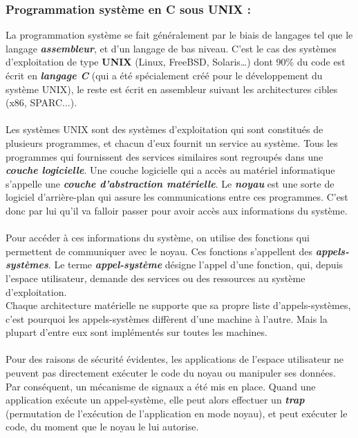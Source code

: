 		\subsubsection*{Programmation système en C sous UNIX :} 
			La programmation système se fait généralement par le biais de langages tel que le langage \textit{\textbf{assembleur}}, et d’un langage de bas niveau. C’est le cas des systèmes d’exploitation de type \textbf{UNIX} (Linux, FreeBSD, Solaris…) dont 90\% du code est écrit en \textit{\textbf{langage C}} (qui a été spécialement créé pour le développement du système UNIX), le reste est écrit en assembleur suivant les architectures cibles (x86, SPARC...).
			
			\paragraph{} Les systèmes UNIX sont des systèmes d'exploitation qui sont constitués de plusieurs programmes, et chacun d'eux fournit un service au système. Tous les programmes qui fournissent des services similaires sont regroupés dans une \textit{\textbf{couche logicielle}}. Une couche logicielle qui a accès au matériel informatique s'appelle une \textit{\textbf{couche d'abstraction matérielle}}. Le \textit{\textbf{noyau}} est une sorte de logiciel d'arrière-plan qui assure les communications entre ces programmes. C'est donc par lui qu'il va falloir passer pour avoir accès aux informations du système.
			
			\paragraph{} Pour accéder à ces informations du système, on utilise des fonctions qui permettent de communiquer avec le noyau. Ces fonctions s'appellent des \textit{\textbf{appels-systèmes}}. Le terme \textit{\textbf{appel-système}} désigne l'appel d'une fonction, qui, depuis l'espace utilisateur, demande des services ou des ressources au système d'exploitation.\\
			Chaque architecture matérielle ne supporte que sa propre liste d'appels-systèmes, c'est pourquoi les appels-systèmes diffèrent d'une machine à l'autre. Mais la plupart d'entre eux sont implémentés sur toutes les machines.

			\paragraph{} Pour des raisons de sécurité évidentes, les applications de l'espace utilisateur ne peuvent pas directement exécuter le code du noyau ou manipuler ses données. Par conséquent, un mécanisme de signaux a été mis en place. Quand une application exécute un appel-système, elle peut alors effectuer un \textit{\textbf{trap}} (permutation de l'exécution de l'application en mode noyau), et peut exécuter le code, du moment que le noyau le lui autorise.
